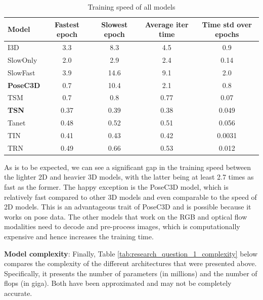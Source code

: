 \documentclass[extern,palatino]{cgMA}
\begin{document}
\begin{table}[h!]
  \begin{center}
    \caption{Training speed of all models}
    \label{tab:research_question_1_training_speed}
    \begin{tabular}{l|c|c|c|c}
      \textbf{Model} & \textbf{Fastest epoch} & \textbf{Slowest epoch} & \textbf{Average iter time} & \textbf{Time std over epochs}\\
      \hline
      I3D & 3.3 & 8.3 & 4.5 & 0.9\\
      SlowOnly & 2.0 & 2.9 & 2.4 & 0.14 \\
      SlowFast & 3.9 & 14.6 & 9.1 & 2.0\\
      \textbf{PoseC3D} & 0.7 & 10.4 & 2.1 & 0.8\\
      TSM & 0.7 & 0.8 & 0.77 & 0.07\\
      \textbf{TSN} & 0.37 & 0.39 & 0.38 & 0.049\\
      Tanet & 0.48 & 0.52 & 0.51 & 0.056\\
      TIN & 0.41 & 0.43 & 0.42 & 0.0031\\
      TRN & 0.49 & 0.66 & 0.53 & 0.012\\
    \end{tabular}
  \end{center}
\end{table}

\noindent As is to be expected, we can see a significant gap in the training speed between the lighter 2D and heavier 3D models, with the latter being at least 2.7 times as fast as the former. The happy exception is the PoseC3D model, which is relatively fast compared to other 3D models and even comparable to the speed of 2D models. This is an advantageous trait of PoseC3D and is possible because it works on pose data. The other models that work on the RGB and optical flow modalities need to decode and pre-process images, which is computationally expensive and hence increases the training time.

\bigskip \bigskip
\noindent \textbf{Model complexity}: Finally, Table \ref{tab:research_question_1_complexity} below compares the complexity of the different architectures that were presented above. Specifically, it presents the number of parameters (in millions) and the number of flops (in giga). Both have been approximated and may not be completely accurate.
\end{document}
